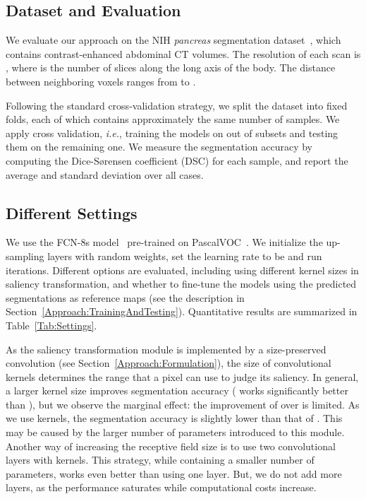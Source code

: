 \documentclass[10pt,twocolumn,letterpaper]{article}
\begin{document}
\subsection{Dataset and Evaluation}
\label{ExperimentsNIH:DatasetAndEvaluation}

We evaluate our approach on the NIH {\em pancreas} segmentation dataset~\cite{Roth_2015_DeepOrgan},
which contains  contrast-enhanced abdominal CT volumes.
The resolution of each scan is ,
where  is the number of slices along the long axis of the body.
The distance between neighboring voxels ranges from  to .

Following the standard cross-validation strategy, we split the dataset into  fixed folds,
each of which contains approximately the same number of samples.
We apply cross validation, {\em i.e.}, training the models on  out of  subsets and testing them on the remaining one.
We measure the segmentation accuracy by computing the Dice-S{\o}rensen coefficient (DSC) for each sample,
and report the average and standard deviation over all  cases.


\subsection{Different Settings}
\label{ExperimentsNIH:Settings}

We use the FCN-8s model~\cite{Long_2015_Fully} pre-trained on PascalVOC~\cite{Everingham_2010_Pascal}.
We initialize the up-sampling layers with random weights, set the learning rate to be  and run  iterations.
Different options are evaluated, including using different kernel sizes in saliency transformation,
and whether to fine-tune the models using the predicted segmentations as reference maps
(see the description in Section~\ref{Approach:TrainingAndTesting}).
Quantitative results are summarized in Table~\ref{Tab:Settings}.

As the saliency transformation module is implemented by a size-preserved convolution (see Section~\ref{Approach:Formulation}),
the size of convolutional kernels determines the range that a pixel can use to judge its saliency.
In general, a larger kernel size improves segmentation accuracy ( works significantly better than ),
but we observe the marginal effect: the improvement of  over  is limited.
As we use  kernels, the segmentation accuracy is slightly lower than that of .
This may be caused by the larger number of parameters introduced to this module.
Another way of increasing the receptive field size is to use two convolutional layers with  kernels.
This strategy, while containing a smaller number of parameters, works even better than using one  layer.
But, we do not add more layers, as the performance saturates while computational costs increase.
\end{document}
